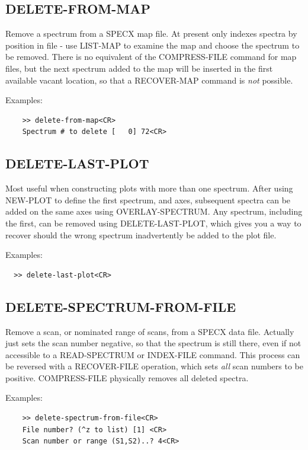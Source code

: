 \documentclass[11pt,twoside]{report}
\begin{document}
\subsection{DELETE-FROM-MAP} 

Remove a spectrum from a SPECX map file. At present only indexes spectra
by position in file - use LIST-MAP to examine the map and choose the
spectrum to be removed. There is no equivalent of the COMPRESS-FILE command
for map files, but the next spectrum added to the map will be inserted in
the first available vacant location, so that a RECOVER-MAP command is {\em not}
possible.

Examples:
\begin{verbatim}
    >> delete-from-map<CR>
    Spectrum # to delete [   0] 72<CR>
\end{verbatim}

\subsection{DELETE-LAST-PLOT} 

Most useful when constructing plots with more than one spectrum. After using
NEW-PLOT to define the first spectrum, and axes, subsequent spectra can be
added on the same axes using OVERLAY-SPECTRUM. Any spectrum, including the 
first, can be removed using DELETE-LAST-PLOT, which gives you a way to 
recover should the wrong spectrum inadvertently be added to the plot file.

Examples:
\begin{verbatim}
  >> delete-last-plot<CR>
\end{verbatim}

\subsection{DELETE-SPECTRUM-FROM-FILE} 

Remove a scan, or nominated range of scans,
from a SPECX data file. Actually just sets the scan number
negative, so that the spectrum is still there, even if not accessible to
a READ-SPECTRUM or INDEX-FILE command. This process can be reversed with a
RECOVER-FILE operation, which sets {\em all} scan numbers to be positive.
COMPRESS-FILE physically removes all deleted spectra.

Examples:
\begin{verbatim}
    >> delete-spectrum-from-file<CR>
    File number? (^z to list) [1] <CR>
    Scan number or range (S1,S2)..? 4<CR>
\end{verbatim}
\end{document}
